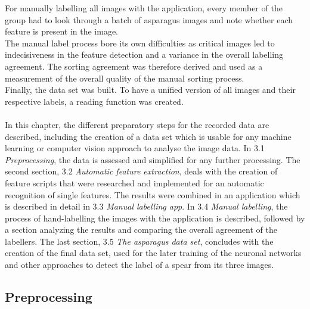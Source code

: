 For manually labelling all images with the application, every member of the group had to look through a batch of asparagus images and note whether each feature is present in the image. \\
The manual label process bore its own difficulties as critical images led to indecisiveness in the feature detection and a variance in the overall labelling agreement. The sorting agreement was therefore derived and used as a measurement of the overall quality of the manual sorting process. \\
Finally, the data set was built. To have a unified version of all images and their respective labels, a reading function was created. \\
\\
In this chapter, the different preparatory steps for the recorded data are described, including the creation of a data set which is usable for any machine learning or computer vision approach to analyse the image data. In 3.1 \textit{Preprocessing}, the data is assessed and simplified for any further processing. The second section, 3.2 \textit{Automatic feature extraction}, deals with the creation of feature scripts that were researched and implemented for an automatic recognition of single features.
The results were combined in an application which is described in detail in 3.3 \textit{Manual labelling app}. In 3.4 \textit{Manual labelling}, the process of hand-labelling the images with the application is described, followed by a section analyzing the results and comparing the overall agreement of the labellers. The last section, 3.5 \textit{The asparagus data set}, concludes with the creation of the final data set, used for the later training of the neuronal networks and other approaches to detect the label of a spear from its three images.



\subsection{Preprocessing}

